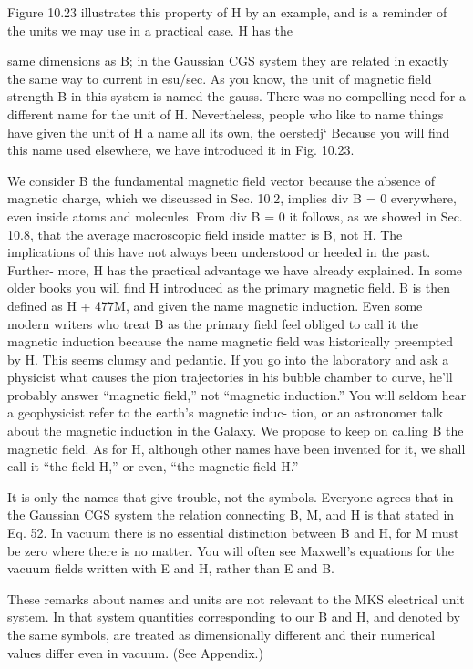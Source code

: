 {{{Figure 10.23 illustrates this property of H by an example, and is
a reminder of the units we may use in a practical case. H has the

same dimensions as B; in the Gaussian CGS system they are related
in exactly the same way to current in esu/sec. As you know, the
unit of magnetic field strength B in this system is named the gauss.
There was no compelling need for a different name for the unit of H.
Nevertheless, people who like to name things have given the unit
of H a name all its own, the oerstedj‘ Because you will find this
name used elsewhere, we have introduced it in Fig. 10.23.

We consider B the fundamental magnetic field vector because the
absence of magnetic charge, which we discussed in Sec. 10.2, implies
div B = 0 everywhere, even inside atoms and molecules. From
div B = 0 it follows, as we showed in Sec. 10.8, that the average
macroscopic field inside matter is B, not H. The implications of
this have not always been understood or heeded in the past. Further-
more, H has the practical advantage we have already explained. In
some older books you will find H introduced as the primary magnetic
field. B is then defined as H + 477M, and given the name magnetic
induction. Even some modern writers who treat B as the primary
field feel obliged to call it the magnetic induction because the name
magnetic field was historically preempted by H. This seems clumsy
and pedantic. If you go into the laboratory and ask a physicist what
causes the pion trajectories in his bubble chamber to curve, he'll
probably answer ``magnetic field,'' not ``magnetic induction.'' You
will seldom hear a geophysicist refer to the earth's magnetic induc-
tion, or an astronomer talk about the magnetic induction in the
Galaxy. We propose to keep on calling B the magnetic field. As
for H, although other names have been invented for it, we shall call
it ``the field H,'' or even, ``the magnetic field H.''

It is only the names that give trouble, not the symbols. Everyone
agrees that in the Gaussian CGS system the relation connecting B,
M, and H is that stated in Eq. 52. In vacuum there is no essential
distinction between B and H, for M must be zero where there is no
matter. You will often see Maxwell's equations for the vacuum fields
written with E and H, rather than E and B.

These remarks about names and units are not relevant to the MKS
electrical unit system. In that system quantities corresponding to
our B and H, and denoted by the same symbols, are treated as
dimensionally different and their numerical values differ even in
vacuum. (See Appendix.)

}}}

